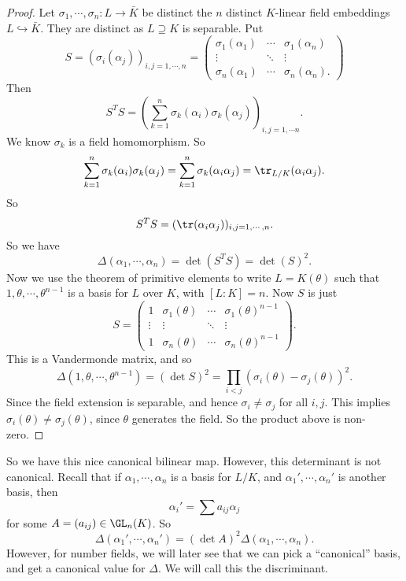 \documentclass[a4paper]{article}
\begin{document}
\begin{proof}
  Let $\sigma_1, \cdots, \sigma_n: L \to \bar{K}$ be distinct the $n$ distinct $K$-linear field embeddings $L \hookrightarrow \bar{K}$. They are distinct as $L \supseteq K$ is separable. Put
  \[
    S = (\sigma_i(\alpha_j))_{i, j = 1, \cdots, n} =
    \begin{pmatrix}
      \sigma_1(\alpha_1) & \cdots & \sigma_1(\alpha_n)\\
      \vdots & \ddots & \vdots\\
      \sigma_n(\alpha_1) & \cdots & \sigma_n(\alpha_n).
    \end{pmatrix}
  \]
  Then
  \[
    S^T S = \left(\sum_{k = 1}^n \sigma_k(\alpha_i)\sigma_k(\alpha_j)\right)_{i,j = 1, \cdots n}.
  \]
  We know $\sigma_k$ is a field homomorphism. So
  \[
    \sum_{k = 1}^n \sigma_k (\alpha_i)\sigma_k(\alpha_j) = \sum_{k = 1}^n \sigma_k(\alpha_i \alpha_j) = \tr_{L/K}(\alpha_i \alpha_j).
  \]
  So
  \[
    S^T S = (\tr(\alpha_i\alpha_j))_{i, j = 1, \cdots, n}.
  \]
  So we have
  \[
    \Delta(\alpha_1, \cdots, \alpha_n) = \det(S^T S) = \det(S)^2.
  \]
  Now we use the theorem of primitive elements to write $L = K(\theta)$ such that $1, \theta, \cdots, \theta^{n - 1}$ is a basis for $L$ over $K$, with $[L:K] = n$. Now $S$ is just
  \[
    S =
    \begin{pmatrix}
      1 & \sigma_1(\theta) & \cdots & \sigma_1(\theta)^{n - 1}\\
      \vdots & \vdots & \ddots & \vdots\\
      1 & \sigma_n(\theta) & \cdots & \sigma_n(\theta)^{n - 1}
    \end{pmatrix}.
  \]
  This is a Vandermonde matrix, and so
  \[
    \Delta(1, \theta, \cdots, \theta^{n - 1}) = (\det S)^2 = \prod_{i < j} (\sigma_i(\theta) - \sigma_j(\theta))^2.
  \]
  Since the field extension is separable, and hence $\sigma_i \not= \sigma_j$ for all $i, j$. This implies $\sigma_i (\theta) \not= \sigma_j(\theta)$, since $\theta$ generates the field. So the product above is non-zero.
\end{proof}
So we have this nice canonical bilinear map. However, this determinant is not canonical. Recall that if $\alpha_1, \cdots, \alpha_n$ is a basis for $L/K$, and $\alpha_1', \cdots, \alpha_n'$ is another basis, then
\[
  \alpha_i' = \sum a_{ij}\alpha_j
\]
for some $A = (a_{ij}) \in \GL_n(K)$. So
\[
  \Delta(\alpha_1', \cdots, \alpha_n') = (\det A)^2 \Delta(\alpha_1, \cdots, \alpha_n).
\]
However, for number fields, we will later see that we can pick a ``canonical'' basis, and get a canonical value for $\Delta$. We will call this the discriminant.
\end{document}
